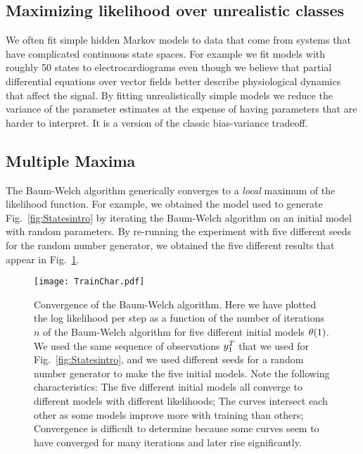 \subsection{Maximizing likelihood over unrealistic classes}
\label{sec:incredible}

We often fit simple hidden Markov models to data that come from
systems that have complicated continuous state spaces.  For example we
fit models with roughly 50 states to electrocardiograms even though we
believe that partial differential equations over vector fields better
describe physiological dynamics that affect the signal.  By fitting
unrealistically simple models we reduce the variance of the parameter
estimates at the expense of having parameters that are harder to
interpret.  It is a version of the classic  bias-variance tradeoff.

\subsection{Multiple Maxima}
\label{sec:MultiMax}

The Baum-Welch algorithm generically converges to a \emph{local}
maximum of the likelihood function.  For example, we obtained the
model used to generate Fig.~\ref{fig:Statesintro} by iterating the
Baum-Welch algorithm on an initial model with random parameters.  By
re-running the experiment with five different seeds for the random
number generator, we obtained the five different results that appear
in Fig.~\ref{fig:TrainChar}.
\begin{figure}
  \centering
  \texttt{[image: TrainChar.pdf]}
  \caption[Convergence of the Baum-Welch algorithm.]{%
    Convergence of the Baum-Welch algorithm.  Here we have
    plotted the log likelihood per step as a function of the number of
    iterations $n$ of the Baum-Welch algorithm for five different
    initial models ${\theta}{(1)}$.  We used the same sequence
    of observations $y_{1}^{T}$ that we used for
    Fig.~\ref{fig:Statesintro}, and we used different seeds for a
    random number generator to make the five initial models.  Note the
    following characteristics: The five different initial models all
    converge to different models with different likelihoods; The curves
    intersect each other as some models improve more with training
    than others; Convergence is difficult to determine because some
    curves seem to have converged for many iterations and later rise
    significantly.  }
  \label{fig:TrainChar}
\end{figure}

